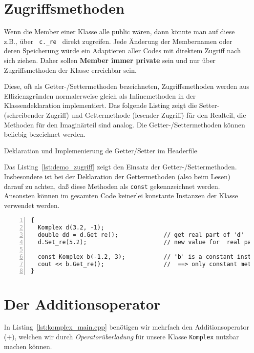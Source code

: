 
%
\section{Zugriffsmethoden}
\label{p:9.6}
Wenn die Member einer Klasse alle public wären, dann könnte man auf diese z.B.,
über \verb| c._re | direkt zugreifen. Jede Änderung der Membernamen oder
deren Speicherung würde ein Adaptieren aller Codes mit direktem Zugriff nach sich ziehen.
Daher sollen \textbf{Member immer private} sein und nur über Zugriffsmethoden
der Klasse erreichbar sein.

Diese, oft als Getter-/Settermethoden bezeichneten, Zugriffsmethoden werden aus
Effizienzgründen normalerweise gleich als Inlinemethoden in der Klassendeklaration
implementiert. Das folgende Listing zeigt die Setter- (schreibender Zugriff) und
Gettermethode (lesender Zugriff) für den Realteil,
die Methoden für den Imaginärteil sind analog.
Die Getter-/Settermethoden können beliebig bezeichnet werden.

{Deklaration und Implemenierung de Getter/Setter im Headerfile}

Das Listing~\ref{lst:demo_zugriff} zeigt den Einsatz der Getter-/Settermethoden.
Insbesondere ist bei der Deklaration der Gettermethoden (also beim Lesen) darauf zu achten,
daß diese Methoden als \verb|const| gekennzeichnet werden.
Ansonsten können im gesamten Code keinerlei konstante Instanzen der Klasse verwendet werden.
\begin{lstlisting}[caption={Demonstration der Getter/Setter},label=lst:demo_zugriff,
basicstyle=\scriptsize,numbers=left, numberstyle=\tiny, stepnumber=2, numbersep=5pt]
{
  Komplex d(3.2, -1);
  double dd = d.Get_re();             // get real part of 'd'
  d.Set_re(5.2);                      // new value for  real part of 'd'

  const Komplex b(-1.2, 3);           // 'b' is a constant instance
  cout << b.Get_re();                 //  ==> only constant methods allowed for 'b'
}
\end{lstlisting}
%
%
%
\section{Der Additionsoperator}
\label{p:9.7}
In Listing~\ref{lst:komplex_main.cpp} benötigen wir mehrfach den Additionsoperator ($+$), welchen
wir durch \emph{Operatorüberladung} für unsere
Klasse \texttt{Komplex} nutzbar machen können.

